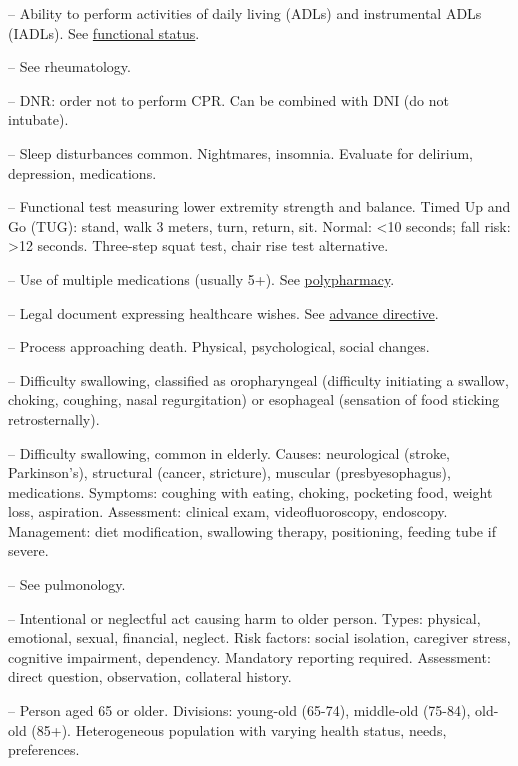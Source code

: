 -- Ability to perform activities of daily living (ADLs) and instrumental ADLs (IADLs). See \hyperlink{Functional Status}{functional status}.

-- See rheumatology.

-- DNR: order not to perform CPR. Can be combined with DNI (do not intubate).

-- Sleep disturbances common. Nightmares, insomnia. Evaluate for delirium, depression, medications.

-- Functional test measuring lower extremity strength and balance. Timed Up and Go (TUG): stand, walk 3 meters, turn, return, sit. Normal: <10 seconds; fall risk: >12 seconds. Three-step squat test, chair rise test alternative.

-- Use of multiple medications (usually 5+). See \hyperlink{Polypharmacy}{polypharmacy}.


-- Legal document expressing healthcare wishes. See \hyperlink{Advance Directive}{advance directive}.

-- Process approaching death. Physical, psychological, social changes.

-- Difficulty swallowing, classified as oropharyngeal (difficulty initiating a swallow, choking, coughing, nasal regurgitation) or esophageal (sensation of food sticking retrosternally).

-- Difficulty swallowing, common in elderly. Causes: neurological (stroke, Parkinson's), structural (cancer, stricture), muscular (presbyesophagus), medications. Symptoms: coughing with eating, choking, pocketing food, weight loss, aspiration. Assessment: clinical exam, videofluoroscopy, endoscopy. Management: diet modification, swallowing therapy, positioning, feeding tube if severe.

-- See pulmonology.

-- Intentional or neglectful act causing harm to older person. Types: physical, emotional, sexual, financial, neglect. Risk factors: social isolation, caregiver stress, cognitive impairment, dependency. Mandatory reporting required. Assessment: direct question, observation, collateral history.

-- Person aged 65 or older. Divisions: young-old (65-74), middle-old (75-84), old-old (85+). Heterogeneous population with varying health status, needs, preferences.

